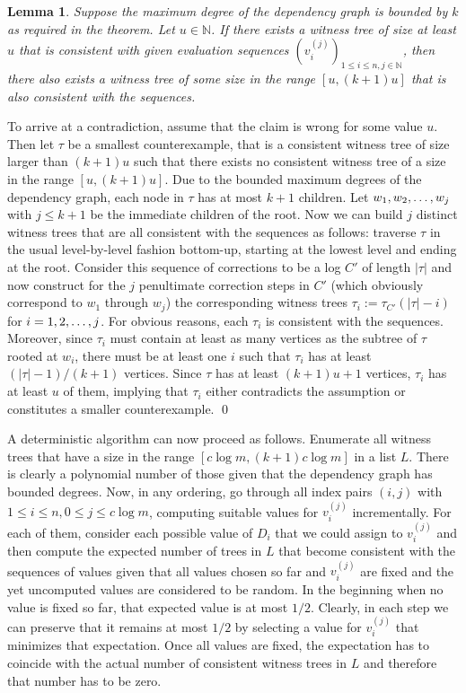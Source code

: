 \documentclass[11pt,a4paper]{article}
\newtheorem{lemma}[theorem]{Lemma}
\begin{document}
\begin{lemma}
\label{smallerwitnesses}
Suppose the maximum degree of the dependency graph is bounded by $k$ as required in the
theorem. Let $u \in \mathbb{N}$. If there exists a witness tree of size at least $u$ 
that is consistent with given evaluation sequences $(v_i^{(j)})_{1 \le i \le n, j \in \mathbb{N}}$, then there also exists
a witness tree of some size in the range $[u, (k+1)u]$ that is also consistent with the sequences.
\end{lemma}

\proof To arrive at a contradiction, assume that the claim is wrong for some value $u$. Then let
$\tau$ be a smallest counterexample, that is a consistent witness tree of size larger than $(k+1)u$ such
that there exists no consistent witness tree of a size in the range $[u,(k+1)u]$. Due to the bounded
maximum degrees of the dependency graph, each node in $\tau$ has at most $k+1$ children. Let $w_1, w_2, \mathellipsis, w_j$
with $j \le k+1$ be the immediate children of the root. Now we can build $j$ distinct witness trees
that are all consistent with the sequences as follows: traverse $\tau$ in the usual level-by-level fashion
bottom-up, starting at the lowest level and ending at the root. Consider this sequence of corrections
to be a log $C'$ of length $|\tau|$ and now construct for the $j$ penultimate correction steps in 
$C'$ (which obviously correspond to $w_1$ through $w_j$) the corresponding witness trees $\tau_i := \tau_{C'}(|\tau|-i)$
for $i=1,2, \mathellipsis, j$. For obvious reasons, each $\tau_i$ is consistent with the sequences.
Moreover, since $\tau_i$ must contain at least as many vertices as the subtree of $\tau$ rooted at $w_i$,
there must be at least one $i$ such that $\tau_i$ has at least $(|\tau|-1)/(k+1)$ vertices. Since
$\tau$ has at least $(k+1)u + 1$ vertices, $\tau_i$ has at least $u$ of them, implying that $\tau_i$ either
contradicts the assumption or constitutes a smaller counterexample. \qed

A deterministic algorithm can now proceed as follows. Enumerate all witness trees that have a size
in the range $[c \log m, (k+1) c \log m]$ in a list $L$. There is clearly a polynomial number of those given that
the dependency graph has bounded degrees. Now, in any ordering, go through all index pairs $(i,j)$
with $1 \le i \le n, 0 \le j \le c \log m$, computing suitable values for $v_i^{(j)}$ incrementally.
For each of them, consider each possible value of $D_i$ that we could assign to $v_i^{(j)}$ and then
compute the expected number of trees in $L$ that become consistent with the sequences of values given
that all values chosen so far and $v_i^{(j)}$ are fixed and the yet uncomputed values are considered
to be random. In the beginning when no value is fixed so far, that expected value is at most $1/2$.
Clearly, in each step we can preserve that it remains at most $1/2$ by selecting a value for $v_i^{(j)}$
that minimizes that expectation. Once all values are fixed, the expectation has to coincide with the
actual number of consistent witness trees in $L$ and therefore that number has to be zero.
\end{document}
